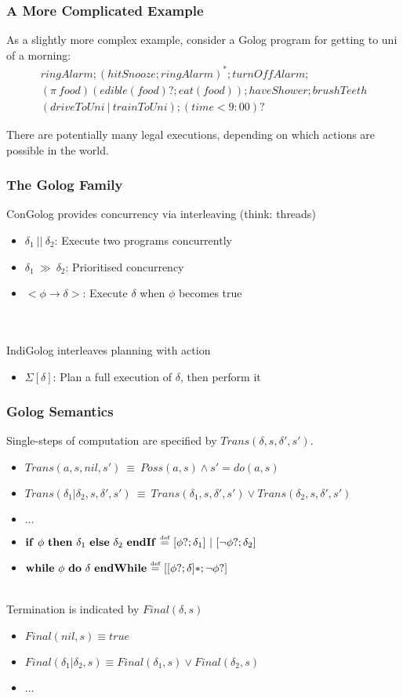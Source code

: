 \documentclass{beamer}
\newcommand{\isdef}{\hbox{$\stackrel{\mbox{\tiny def}}{=}$}}
\begin{document}
\begin{frame}
\frametitle{A More Complicated Example}
As a slightly more complex example, consider a Golog program for
getting to uni of a morning:\[
\begin{array}{c}
ringAlarm;(hitSnooze; ringAlarm)^*;turnOffAlarm;\\
(\pi\ food)(edible(food)?;eat(food)); haveShower; brushTeeth\\
(driveToUni\ |\ trainToUni); (time<9:00)?
\end{array}\]

There are potentially many legal executions, depending on which actions
are possible in the world.
\end{frame}

\begin{frame}
\frametitle{The Golog Family}
ConGolog provides concurrency via interleaving (think: threads)
\begin{itemize}
  \item $\delta_1\ ||\ \delta_2$: Execute two programs concurrently
  \item $\delta_1\ \gg\ \delta_2$: Prioritised concurrency
  \item $<\phi \rightarrow \delta>$: Execute $\delta$ when $\phi$ becomes true
\end{itemize}
\ \\
\ \\
\pause
IndiGolog interleaves planning with action
\begin{itemize}
  \item $\Sigma[\delta]$: Plan a full execution of $\delta$, then perform it
\end{itemize}

\end{frame}

\begin{frame}
\frametitle{Golog Semantics}
Single-steps of computation are specified by  $Trans(\delta,s,\delta',s')$.
\begin{itemize}
  \item $Trans(a,s,nil,s')\ \equiv\ Poss(a,s)\wedge s'=do(a,s)$
  \item $Trans(\delta_1|\delta_2,s,\delta',s')\ \equiv\ Trans(\delta_1,s,\delta',s')\vee Trans(\delta_2,s,\delta',s')$
  \item $\dots$
  \pause
  \item $\mathbf{if}\ \phi\ \mathbf{then}\ \delta_1\ \mathbf{else}\ \delta_2\ \mathbf{endIf}\ \isdef\ [\phi?;\delta_1]\ |\ [\neg\phi?;\delta_2]$
  \pause
  \item $\mathbf{while}\ \phi\ \mathbf{do}\ \delta\ \mathbf{endWhile}\ \isdef\ [[\phi?;\delta]*;\neg\phi?]$
\end{itemize}
\ \\
\pause
Termination is indicated by $Final(\delta,s)$
\begin{itemize}
  \item $Final(nil,s) \equiv true$
  \item $Final(\delta_1|\delta_2,s) \equiv Final(\delta_1,s)\vee Final(\delta_2,s)$
  \item $\dots$
\end{itemize}
\end{frame}
\end{document}
